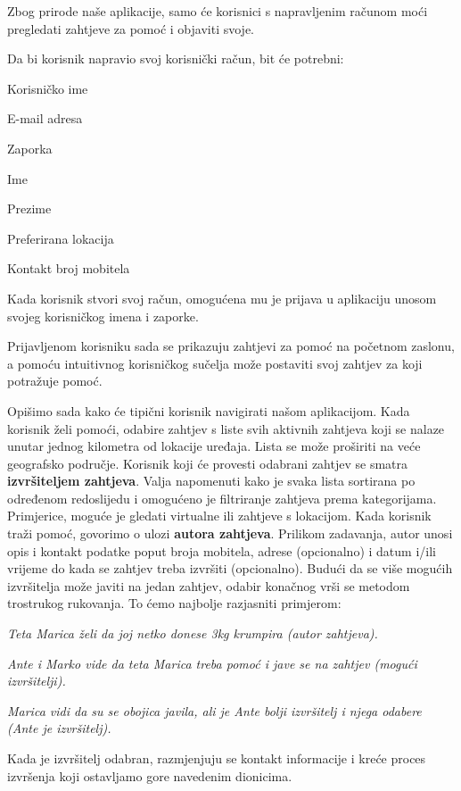 Zbog prirode naše aplikacije, samo će korisnici s napravljenim računom moći pregledati zahtjeve za pomoć i objaviti svoje.

\pagebreak
 Da bi korisnik napravio svoj korisnički račun, bit će potrebni:

\begin{packed_item}
	\item Korisničko ime
	\item E-mail adresa
	\item Zaporka
	\item Ime
	\item Prezime
	\item Preferirana lokacija
	\item Kontakt broj mobitela
\end{packed_item}

Kada korisnik stvori svoj račun, omogućena mu je prijava u aplikaciju unosom svojeg korisničkog imena i zaporke.

Prijavljenom korisniku sada se prikazuju zahtjevi za pomoć na početnom zaslonu, a pomoću intuitivnog korisničkog sučelja može postaviti svoj zahtjev za koji potražuje pomoć.

Opišimo sada kako će tipični korisnik navigirati našom aplikacijom.
Kada korisnik želi pomoći, odabire zahtjev s liste svih aktivnih zahtjeva
koji se nalaze unutar jednog kilometra od lokacije uređaja. Lista se može
proširiti na veće geografsko područje. Korisnik koji će provesti odabrani zahtjev
se smatra \textbf{izvršiteljem zahtjeva}. Valja napomenuti kako je svaka lista sortirana po određenom redoslijedu i omogućeno je
filtriranje zahtjeva prema kategorijama. Primjerice, moguće je gledati virtualne ili zahtjeve s lokacijom.
Kada korisnik traži pomoć, govorimo o ulozi \textbf{autora zahtjeva}. Prilikom zadavanja, autor unosi opis i kontakt podatke poput broja mobitela, adrese (opcionalno) i datum i/ili vrijeme do kada se zahtjev treba izvršiti (opcionalno).
Budući da se više mogućih izvršitelja može javiti na jedan zahtjev, odabir konačnog vrši se metodom trostrukog rukovanja. To ćemo najbolje razjasniti primjerom: 

	\begin{packed_item}
	\item \textit {Teta Marica želi da joj netko donese 3kg krumpira (autor zahtjeva).}
	
	\item \textit {Ante i Marko vide da teta Marica treba pomoć i jave se na zahtjev (mogući izvršitelji).}
	\item \textit {Marica vidi da su se obojica javila, ali je Ante bolji izvršitelj i njega odabere (Ante je izvršitelj).}
	\end{packed_item}
	Kada je izvršitelj odabran, razmjenjuju se kontakt informacije i kreće proces izvršenja koji ostavljamo gore navedenim dionicima. 
	
